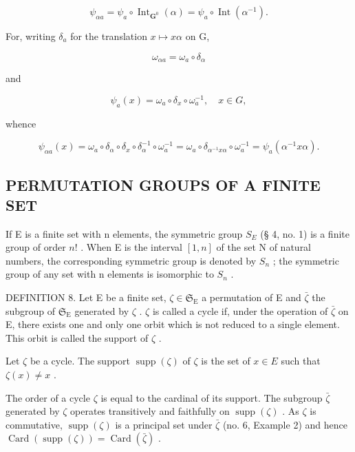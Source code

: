 \[
\psi_ {\alpha a} = \psi_ {a} \circ \operatorname{Int} _ {\mathbf {G} ^ {0}} (\alpha) = \psi_ {a} \circ \operatorname{Int} (\alpha^ {- 1}).\tag{3}
\]

For, writing \(\delta_{a}\) for the translation \(x\mapsto x\alpha\) on G,

\[
\omega_ {\alpha a} = \omega_ {a} \circ \delta_ {\alpha}
\]

and

\[
\psi_ {a} (x) = \omega_ {a} \circ \delta_ {x} \circ \omega_ {a} ^ {- 1}, \quad x \in G,
\]

whence

\[
\psi_ {\alpha a} (x) = \omega_ {a} \circ \delta_ {\alpha} \circ \delta_ {x} \circ \delta_ {\alpha} ^ {- 1} \circ \omega_ {a} ^ {- 1} = \omega_ {a} \circ \delta_ {\alpha^ {- 1} x \alpha} \circ \omega_ {a} ^ {- 1} = \psi_ {a} (\alpha^ {- 1} x \alpha).
\]

\subsection{PERMUTATION GROUPS OF A FINITE SET}

If E is a finite set with n elements, the symmetric group \(S_{E}\) (§ 4, no. 1) is a finite group of order \(n!\) . When E is the interval \([1, n]\) of the set N of natural numbers, the corresponding symmetric group is denoted by \(S_{n}\) ; the symmetric group of any set with n elements is isomorphic to \(S_{n}\) .

DEFINITION 8. Let E be a finite set, \(\zeta \in \mathfrak{S}_{\mathrm{E}}\) a permutation of E and \(\bar{\zeta}\) the subgroup of \(\mathfrak{S}_{\mathrm{E}}\) generated by \(\zeta\) . \(\zeta\) is called a cycle if, under the operation of \(\bar{\zeta}\) on E, there exists one and only one orbit which is not reduced to a single element. This orbit is called the support of \(\zeta\) .

Let \(\zeta\) be a cycle. The support \(\operatorname{supp}(\zeta)\) of \(\zeta\) is the set of \(x \in E\) such that \(\zeta(x) \neq x\) .

The order of a cycle \(\zeta\) is equal to the cardinal of its support. The subgroup \(\bar{\zeta}\) generated by \(\zeta\) operates transitively and faithfully on \(\operatorname{supp}(\zeta)\) . As \(\zeta\) is commutative, \(\operatorname{supp}(\zeta)\) is a principal set under \(\bar{\zeta}\) (no. 6, Example 2) and hence \(\operatorname{Card}(\operatorname{supp}(\zeta)) = \operatorname{Card}(\bar{\zeta})\) .

